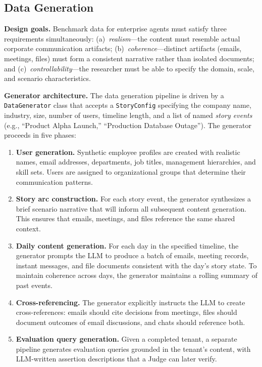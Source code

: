 \documentclass[10pt,twocolumn]{article}
\begin{document}
\subsection{Data Generation}
\label{sec:datagen}

\textbf{Design goals.}
Benchmark data for enterprise agents must satisfy three requirements
simultaneously:
(a)~\emph{realism}---the content must resemble actual corporate communication
artifacts;
(b)~\emph{coherence}---distinct artifacts (emails, meetings, files) must form a
consistent narrative rather than isolated documents; and
(c)~\emph{controllability}---the researcher must be able to specify the domain,
scale, and scenario characteristics.

\textbf{Generator architecture.}
The data generation pipeline is driven by a \texttt{DataGenerator} class that
accepts a \texttt{StoryConfig} specifying the company name, industry, size,
number of users, timeline length, and a list of named \emph{story events}
(e.g., ``Product Alpha Launch,'' ``Production Database Outage'').  The
generator proceeds in five phases:

\begin{enumerate}[leftmargin=*,itemsep=2pt]
  \item \textbf{User generation.}
    Synthetic employee profiles are created with realistic names, email
    addresses, departments, job titles, management hierarchies, and skill sets.
    Users are assigned to organizational groups that determine their
    communication patterns.

  \item \textbf{Story arc construction.}
    For each story event, the generator synthesizes a brief scenario narrative
    that will inform all subsequent content generation.  This ensures that
    emails, meetings, and files reference the same shared context.

  \item \textbf{Daily content generation.}
    For each day in the specified timeline, the generator prompts the LLM to
    produce a batch of emails, meeting records, instant messages, and file
    documents consistent with the day's story state.  To maintain coherence
    across days, the generator maintains a rolling summary of past events.

  \item \textbf{Cross-referencing.}
    The generator explicitly instructs the LLM to create cross-references:
    emails should cite decisions from meetings, files should document outcomes
    of email discussions, and chats should reference both.

  \item \textbf{Evaluation query generation.}
    Given a completed tenant, a separate pipeline generates evaluation queries
    grounded in the tenant's content, with LLM-written assertion descriptions
    that a Judge can later verify.
\end{enumerate}
\end{document}
